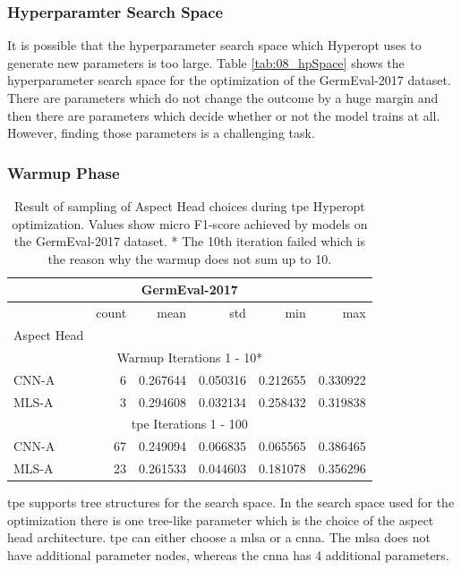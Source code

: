 \subsubsection*{Hyperparamter Search Space}

It is possible that the hyperparameter search space which Hyperopt uses to generate new parameters is too large. Table \ref{tab:08_hpSpace} shows the hyperparameter search space for the optimization of the GermEval-2017 dataset. There are parameters which do not change the outcome by a huge margin and then there are parameters which decide whether or not the model trains at all. However, finding those parameters is a challenging task.

\subsubsection*{Warmup Phase}
\label{sec:06_hp_warmup}
\begin{table}[]
	\centering
	\begin{tabular}{lrrrrr}
	\multicolumn{6}{c}{GermEval-2017} \\

	\toprule
	{} &  count &      mean &       std &       min &       max \\
	Aspect Head &        &           &           &           &           \\
	\midrule
	\multicolumn{6}{c}{Warmup Iterations 1 - 10*} \\
	CNN-A    &    6 &  0.267644 &  0.050316 &  0.212655 &  0.330922 \\
	MLS-A    &    3 &  0.294608 &  0.032134 &  0.258432 &  0.319838 \\
	\midrule
	\multicolumn{6}{c}{\gls{tpe} Iterations 1 - 100} \\
	CNN-A    &   67 &  0.249094 &  0.066835 &  0.065565 &  0.386465 \\
	MLS-A    &   23 &  0.261533 &  0.044603 &  0.181078 &  0.356296 \\
	\bottomrule
	\end{tabular}
	\caption{Result of sampling of Aspect Head choices during \gls{tpe} Hyperopt optimization. Values show micro F1-score achieved by models on the GermEval-2017 dataset. * The 10th iteration failed which is the reason why the warmup does not sum up to 10.}
	\label{tab:08_hpAspectHeadsSpace}	
\end{table}

\gls{tpe} supports tree structures for the search space. In the search space used for the optimization there is one tree-like parameter which is the choice of the aspect head architecture. \gls{tpe} can either choose a \gls{mlsa} or a \gls{cnna}. The \gls{mlsa} does not have additional parameter nodes, whereas the \gls{cnna} has 4 additional parameters.
\medskip

